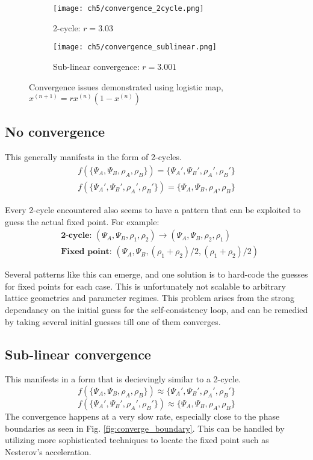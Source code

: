 \begin{figure}[!htb]
    \centering
    \begin{subfigure}[b]{0.45\textwidth}  %
        \centering
        \texttt{[image: ch5/convergence\_2cycle.png]}
        \caption{2-cycle: $r = 3.03$}
    \end{subfigure}
    \hspace{1em}  %
    \begin{subfigure}[b]{0.45\textwidth}
        \centering
        \texttt{[image: ch5/convergence\_sublinear.png]}
        \caption{Sub-linear convergence: $r = 3.001$}
    \end{subfigure}
    \caption{Convergence issues demonstrated using logistic map, $x^{(n+1)} = rx^{(n)}(1 - x^{(n)})$}
    \label{}
\end{figure}
\FloatBarrier \!\!\!\!\!\!\!\!\!\!\!

\subsection{No convergence}
This generally manifests in the form of 2-cycles. 
\begin{align*}
    f(\{\Psi_A, \Psi_B, \rho_A, \rho_B\}) = \{\Psi_A', \Psi_B', \rho_A', \rho_B'\}\\
    f(\{\Psi_A', \Psi_B', \rho_A', \rho_B'\}) = \{\Psi_A, \Psi_B, \rho_A, \rho_B\}    
\end{align*}

Every 2-cycle encountered also seems to have a pattern that can be exploited to guess the actual fixed point. For example:
\begin{align*}
    &\textbf{2-cycle: }(\Psi_A, \Psi_B, \rho_1, \rho_2) \rightarrow (\Psi_A, \Psi_B, \rho_2, \rho_1)\\
    &\textbf{Fixed point: } (\Psi_A, \Psi_B, (\rho_1 + \rho_2)/2, (\rho_1 + \rho_2)/2)        
\end{align*}

Several patterns like this can emerge, and one solution is to hard-code the guesses for fixed points for each case. This is unfortunately not scalable to arbitrary lattice geometries and parameter regimes. This problem arises from the strong dependancy on the initial guess for the self-consistency loop, and can be remedied by taking several initial guesses till one of them converges.

\subsection{Sub-linear convergence}
This manifests in a form that is decievingly similar to a 2-cycle.
$$f(\{\Psi_A, \Psi_B, \rho_A, \rho_B\}) \approx \{\Psi_A', \Psi_B', \rho_A', \rho_B'\}$$
$$f(\{\Psi_A', \Psi_B', \rho_A', \rho_B'\}) \approx \{\Psi_A, \Psi_B, \rho_A, \rho_B\}$$
The convergence happens at a very slow rate, especially close to the phase boundaries as seen in Fig. \ref{fig:converge_boundary}. This can be handled by utilizing more sophisticated techniques to locate the fixed point such as Nesterov's acceleration. 

